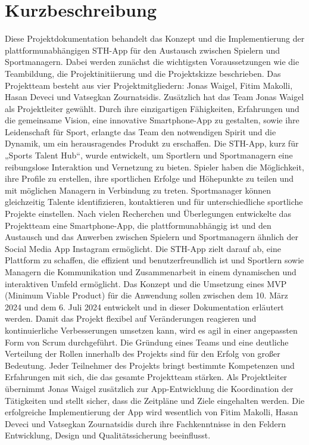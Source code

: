 \chapter{Kurzbeschreibung}
Diese Projektdokumentation behandelt das Konzept und die Implementierung der plattformunabhängigen STH-App für den Austausch zwischen Spielern und Sportmanagern.
Dabei werden zunächst die wichtigsten Voraussetzungen wie die Teambildung, die Projektinitiierung und die Projektskizze beschrieben.
Das Projektteam besteht aus vier Projektmitgliedern: Jonas Waigel, Fitim Makolli, Hasan Deveci und Vatsegkan Zournatsidis.
Zusätzlich hat das Team Jonas Waigel als Projektleiter gewählt.
Durch ihre einzigartigen Fähigkeiten, Erfahrungen und die gemeinsame Vision, eine innovative Smartphone-App zu gestalten, sowie ihre Leidenschaft für Sport, erlangte das Team den notwendigen Spirit und die Dynamik, um ein herausragendes Produkt zu erschaffen.
\newline
Die STH-App, kurz für „Sports Talent Hub“, wurde entwickelt, um Sportlern und Sportmanagern eine reibungslose Interaktion und Vernetzung zu bieten.
Spieler haben die Möglichkeit, ihre Profile zu erstellen, ihre sportlichen Erfolge und Höhepunkte zu teilen und mit möglichen Managern in Verbindung zu treten.
Sportmanager können gleichzeitig Talente identifizieren, kontaktieren und für unterschiedliche sportliche Projekte einstellen.
\newline
Nach vielen Recherchen und Überlegungen entwickelte das Projektteam eine Smartphone-App, die plattformunabhängig ist und den Austausch und das Anwerben zwischen Spielern und Sportmanagern ähnlich der Social Media App Instagram ermöglicht.
Die STH-App zielt darauf ab, eine Plattform zu schaffen, die effizient und benutzerfreundlich ist und Sportlern sowie Managern die Kommunikation und Zusammenarbeit in einem dynamischen und interaktiven Umfeld ermöglicht.
\newline
Das Konzept und die Umsetzung eines MVP (Minimum Viable Product) für die Anwendung sollen zwischen dem 10. März 2024 und dem 6. Juli 2024 entwickelt und in dieser Dokumentation erläutert werden.
Damit das Projekt flexibel auf Veränderungen reagieren und kontinuierliche Verbesserungen umsetzen kann, wird es agil in einer angepassten Form von Scrum durchgeführt.
Die Gründung eines Teams und eine deutliche Verteilung der Rollen innerhalb des Projekts sind für den Erfolg von großer Bedeutung.
Jeder Teilnehmer des Projekts bringt bestimmte Kompetenzen und Erfahrungen mit sich, die das gesamte Projektteam stärken.
Als Projektleiter übernimmt Jonas Waigel zusätzlich zur App-Entwicklung die Koordination der Tätigkeiten und stellt sicher, dass die Zeitpläne und Ziele eingehalten werden.
Die erfolgreiche Implementierung der App wird wesentlich von Fitim Makolli, Hasan Deveci und Vatsegkan Zournatsidis durch ihre Fachkenntnisse in den Feldern Entwicklung, Design und Qualitätssicherung beeinflusst.